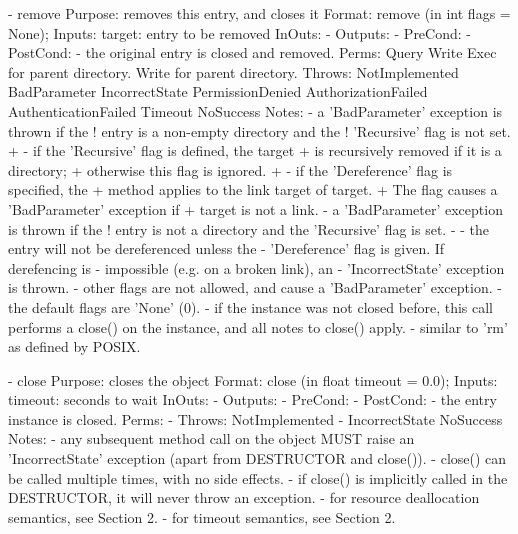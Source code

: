 \begin{myspec}
 
    - remove
      Purpose:  removes this entry, and closes it
      Format:   remove             (in  int  flags = None);
      Inputs:   target:             entry to be removed
      InOuts:   -
      Outputs:  -
      PreCond:  -
      PostCond: - the original entry is closed and removed.
      Perms:    Query 
                Write 
                Exec  for parent directory.
                Write for parent directory.
      Throws:   NotImplemented
                BadParameter
                IncorrectState
                PermissionDenied
                AuthorizationFailed
                AuthenticationFailed
                Timeout
                NoSuccess
      Notes:    - a 'BadParameter' exception is thrown if the 
!                 entry is a non-empty directory and the 
!                 'Recursive' flag is not set.
+               - if the 'Recursive' flag is defined, the target
+                 is recursively removed if it is a directory;
+                 otherwise this flag is ignored.
+               - if the 'Dereference' flag is specified, the
+                 method applies to the link target of target.
+                 The flag causes a 'BadParameter' exception if
+                 target is not a link.
                - a 'BadParameter' exception is thrown if the 
!                 entry is not a directory and the 'Recursive' 
                  flag is set.
-               - the entry will not be dereferenced unless the
-                 'Dereference' flag is given.  If derefencing is
-                 impossible (e.g. on a broken link), an
-                 'IncorrectState' exception is thrown.
                - other flags are not allowed, and cause a
                  'BadParameter' exception.
                - the default flags are 'None' (0).
                - if the instance was not closed before, this
                  call performs a close() on the instance, and 
                  all notes to close() apply.
                - similar to 'rm' as defined by POSIX.
 
 
    - close
      Purpose:  closes the object
      Format:   close              (in  float timeout = 0.0);
      Inputs:   timeout:            seconds to wait
      InOuts:   -
      Outputs:  -
      PreCond:  -
      PostCond: - the entry instance is closed.
      Perms:    -
      Throws:   NotImplemented
-               IncorrectState
                NoSuccess
      Notes:    - any subsequent method call on the object
                  MUST raise an 'IncorrectState' exception
                  (apart from DESTRUCTOR and close()).
                - close() can be called multiple times, with no
                  side effects.
                - if close() is implicitly called in the
                  DESTRUCTOR, it will never throw an exception.
                - for resource deallocation semantics, see 
                  Section 2.
                - for timeout semantics, see Section 2.
 

\end{myspec}
